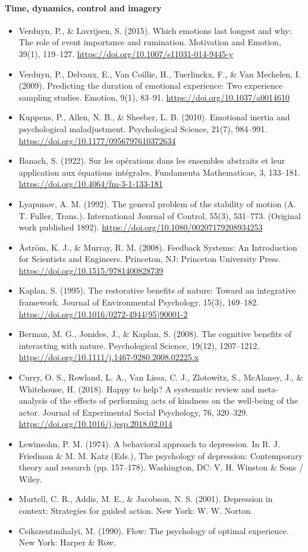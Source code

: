 \documentclass[10pt]{article}
\theoremstyle{remark}
\begin{document}
\paragraph{Time, dynamics, control and imagery}
\begin{itemize}[leftmargin=1em,itemsep=0pt,topsep=1pt,parsep=0pt]
\item Verduyn, P., \& Lavrijsen, S. (2015). Which emotions last longest and why: The role of event importance and rumination. Motivation and Emotion, 39(1), 119--127. \url{https://doi.org/10.1007/s11031-014-9445-y}
\item Verduyn, P., Delvaux, E., Van Coillie, H., Tuerlinckx, F., \& Van Mechelen, I. (2009). Predicting the duration of emotional experience: Two experience sampling studies. Emotion, 9(1), 83--91. \url{https://doi.org/10.1037/a0014610}
\item Kuppens, P., Allen, N. B., \& Sheeber, L. B. (2010). Emotional inertia and psychological maladjustment. Psychological Science, 21(7), 984--991. \url{https://doi.org/10.1177/0956797610372634}
\item Banach, S. (1922). Sur les opérations dans les ensembles abstraits et leur application aux équations intégrales. Fundamenta Mathematicae, 3, 133--181. \url{https://doi.org/10.4064/fm-3-1-133-181}
\item Lyapunov, A. M. (1992). The general problem of the stability of motion (A. T. Fuller, Trans.). International Journal of Control, 55(3), 531--773. (Original work published 1892). \url{https://doi.org/10.1080/00207179208934253}
\item Åström, K. J., \& Murray, R. M. (2008). Feedback Systems: An Introduction for Scientists and Engineers. Princeton, NJ: Princeton University Press. \url{https://doi.org/10.1515/9781400828739}
\item Kaplan, S. (1995). The restorative benefits of nature: Toward an integrative framework. Journal of Environmental Psychology, 15(3), 169--182. \url{https://doi.org/10.1016/0272-4944(95)90001-2}
\item Berman, M. G., Jonides, J., \& Kaplan, S. (2008). The cognitive benefits of interacting with nature. Psychological Science, 19(12), 1207--1212. \url{https://doi.org/10.1111/j.1467-9280.2008.02225.x}
\item Curry, O. S., Rowland, L. A., Van Lissa, C. J., Zlotowitz, S., McAlaney, J., \& Whitehouse, H. (2018). Happy to help? A systematic review and meta-analysis of the effects of performing acts of kindness on the well-being of the actor. Journal of Experimental Social Psychology, 76, 320--329. \url{https://doi.org/10.1016/j.jesp.2018.02.014}
\item Lewinsohn, P. M. (1974). A behavioral approach to depression. In R. J. Friedman \& M. M. Katz (Eds.), The psychology of depression: Contemporary theory and research (pp. 157--178). Washington, DC: V. H. Winston \& Sons / Wiley.
\item Martell, C. R., Addis, M. E., \& Jacobson, N. S. (2001). Depression in context: Strategies for guided action. New York: W. W. Norton.
\item Csikszentmihalyi, M. (1990). Flow: The psychology of optimal experience. New York: Harper \& Row.
\end{itemize}
\end{document}
